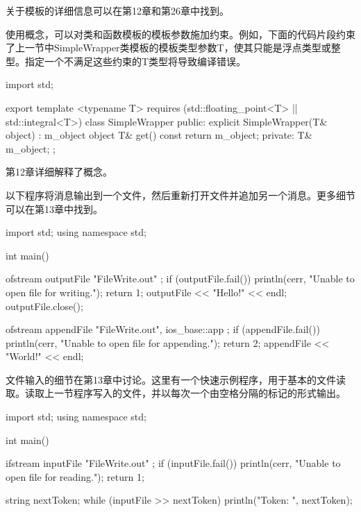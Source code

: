 关于模板的详细信息可以在第12章和第26章中找到。


使用概念，可以对类和函数模板的模板参数施加约束。例如，下面的代码片段约束了上一节中SimpleWrapper类模板的模板类型参数T，使其只能是浮点类型或整型。指定一个不满足这些约束的T类型将导致编译错误。

\begin{cpp}
import std;

export template <typename T> requires (std::floating_point<T> || std::integral<T>)
class SimpleWrapper
{
    public:
        explicit SimpleWrapper(T& object) : m_object { object } { }
        T& get() const { return m_object; }
    private:
        T& m_object;
};
\end{cpp}

第12章详细解释了概念。


以下程序将消息输出到一个文件，然后重新打开文件并追加另一个消息。更多细节可以在第13章中找到。

\begin{cpp}
import std;
using namespace std;

int main()
{
    ofstream outputFile { "FileWrite.out" };
    if (outputFile.fail()) {
        println(cerr, "Unable to open file for writing.");
        return 1;
    }
    outputFile << "Hello!" << endl;
    outputFile.close();

    ofstream appendFile { "FileWrite.out", ios_base::app };
    if (appendFile.fail()) {
        println(cerr, "Unable to open file for appending.");
        return 2;
    }
    appendFile << "World!" << endl;
}
\end{cpp}


文件输入的细节在第13章中讨论。这里有一个快速示例程序，用于基本的文件读取。读取上一节程序写入的文件，并以每次一个由空格分隔的标记的形式输出。

\begin{cpp}
import std;
using namespace std;

int main()
{
    ifstream inputFile { "FileWrite.out" };
    if (inputFile.fail()) {
        println(cerr, "Unable to open file for reading.");
        return 1;
    }

    string nextToken;
    while (inputFile >> nextToken) {
        println("Token: {}", nextToken);
    }
}
\end{cpp}

